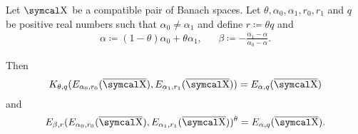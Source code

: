 \begin{theorem}\label{thm:interpolation_space_and_approximation_space_reiteration}
  Let \( \CX \) be a compatible pair of Banach spaces. Let \( \theta, \alpha_0, \alpha_1, r_0, r_1 \) and \( q \) be positive real numbers such that \( \alpha_0 \neq \alpha_1 \) and define \( r \coloneqq \theta q \) and
  \begin{align*}
    \alpha \coloneqq (1 - \theta) \alpha_0 + \theta \alpha_1,
    &&
    \beta \coloneqq - \frac {\alpha_1 - \alpha} {\alpha_0 - \alpha}.
  \end{align*}

  Then
  \begin{equation*}
    K_{\theta,q}(E_{\alpha_0,r_0}(\Ol{\CX}), E_{\alpha_1,r_1}(\Ol{\CX})) = E_{\alpha,q}(\Ol{\CX})
  \end{equation*}
  and
  \begin{equation*}
    E_{\beta,r}(E_{\alpha_0,r_0}(\Ol{\CX}), E_{\alpha_1,r_1}(\Ol{\CX}))^\theta = E_{\alpha,q}(\Ol{\CX}).
  \end{equation*}
\end{theorem}
